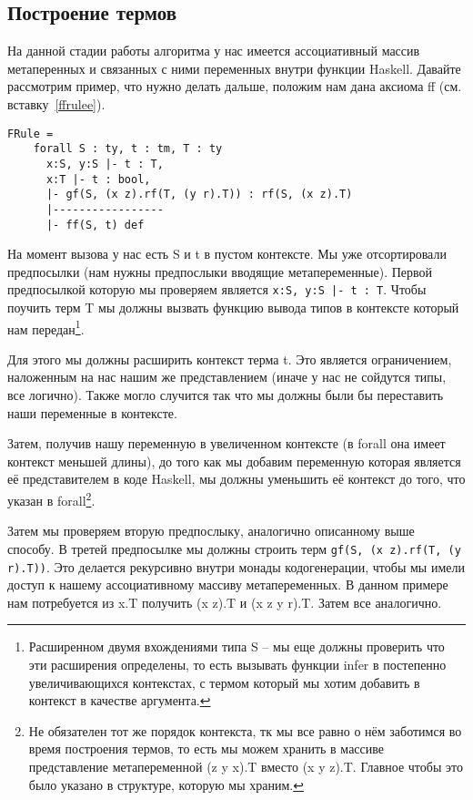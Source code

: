 \subsection{Построение термов}\label{build_exp}
На данной стадии работы алгоритма у нас имеется ассоциативный массив метаперенных и связанных с ними переменных внутри функции Haskell. Давайте рассмотрим пример, что нужно делать дальше, положим нам дана аксиома ff (см. вставку~\ref{ffrulee}).

\begin{lstlisting}[label={ffrulee}, caption={Исскуственное правило вывода для конструкции ff},captionpos=b, frame=single, float, floatplacement=H]
FRule =
    forall S : ty, t : tm, T : ty
      x:S, y:S |- t : T,
      x:T |- t : bool,
      |- gf(S, (x z).rf(T, (y r).T)) : rf(S, (x z).T)
      |-----------------
      |- ff(S, t) def
\end{lstlisting}

На момент вызова у нас есть S и t в пустом контексте. Мы уже отсортировали предпосылки (нам нужны предпослыки вводящие метапеременные). Первой предпосылкой которую мы проверяем является \lstinline{x:S, y:S |- t : T}. Чтобы поучить терм T мы должны вызвать функцию вывода типов в контексте который нам передан\footnote{Расширенном двумя вхождениями типа S -- мы еще должны проверить что эти расширения определены, то есть вызывать функции infer в постепенно увеличивающихся контекстах, с термом который мы хотим добавить в контекст в качестве аргумента.}.

Для этого мы должны расширить контекст терма t. Это является ограничением, наложенным на нас нашим же представлением (иначе у нас не сойдутся типы, все логично). Также могло случится так что мы должны были бы переставить наши переменные в контексте.

Затем, получив нашу переменную в увеличенном контексте (в forall она имеет контекст меньшей длины), до того как мы добавим переменную которая является её представителем в коде Haskell, мы должны уменьшить её контекст до того, что указан в forall\footnote{Не обязателен тот же порядок контекста, тк мы все равно о нём заботимся во время построения термов, то есть мы можем хранить в массиве представление метапеременной (z y x).T вместо (x y z).T. Главное чтобы это было указано в структуре, которую мы храним.}.

Затем мы проверяем вторую предпослыку, аналогично описанному выше способу. В третей предпосылке мы должны строить терм \lstinline{gf(S, (x z).rf(T, (y r).T))}. Это делается рекурсивно внутри монады кодогенерации, чтобы мы имели доступ к нашему ассоциативному массиву метапеременных. В данном примере нам потребуется из x.T получить (x z).T и (x z y r).T. Затем все аналогично.

